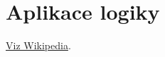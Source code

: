 \chapter{Aplikace logiky}\label{appendix:applications}

{\todo}

\href{https://en.wikipedia.org/wiki/Logic_in_computer_science}{Viz Wikipedia}.
